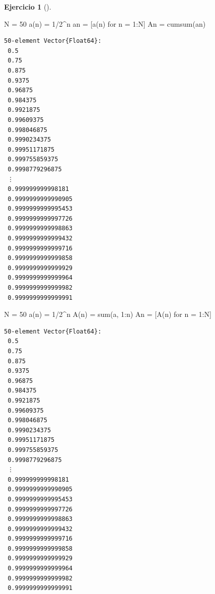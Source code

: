 \documentclass[
  a4paper,
]{scrreport}
\newenvironment{Shaded}{\begin{snugshade}}{\end{snugshade}}
\newcommand{\FloatTok}[1]{\textcolor[rgb]{0.68,0.00,0.00}{#1}}
\newcommand{\FunctionTok}[1]{\textcolor[rgb]{0.28,0.35,0.67}{#1}}
\newcommand{\NormalTok}[1]{\textcolor[rgb]{0.00,0.23,0.31}{#1}}
\newcommand{\OperatorTok}[1]{\textcolor[rgb]{0.37,0.37,0.37}{#1}}
\theoremstyle{definition}
\newtheorem{exercise}{Ejercicio}[chapter]
\theoremstyle{remark}
\begin{document}
\begin{exercise}[]
\begin{tcolorbox}
\begin{Shaded}
\begin{Highlighting}[]
\NormalTok{N }\OperatorTok{=} \FloatTok{50}
\FunctionTok{a}\NormalTok{(n) }\OperatorTok{=} \FloatTok{1}\OperatorTok{/}\FloatTok{2}\OperatorTok{\^{}}\NormalTok{n}
\NormalTok{an }\OperatorTok{=}\NormalTok{ [}\FunctionTok{a}\NormalTok{(n) for n }\OperatorTok{=} \FloatTok{1}\OperatorTok{:}\NormalTok{N]}
\NormalTok{An }\OperatorTok{=} \FunctionTok{cumsum}\NormalTok{(an)}
\end{Highlighting}
\end{Shaded}

\begin{verbatim}
50-element Vector{Float64}:
 0.5
 0.75
 0.875
 0.9375
 0.96875
 0.984375
 0.9921875
 0.99609375
 0.998046875
 0.9990234375
 0.99951171875
 0.999755859375
 0.9998779296875
 ⋮
 0.999999999998181
 0.9999999999990905
 0.9999999999995453
 0.9999999999997726
 0.9999999999998863
 0.9999999999999432
 0.9999999999999716
 0.9999999999999858
 0.9999999999999929
 0.9999999999999964
 0.9999999999999982
 0.9999999999999991
\end{verbatim}

\end{tcolorbox}

\begin{tcolorbox}[enhanced jigsaw, colframe=quarto-callout-tip-color-frame, breakable, colback=white, coltitle=black, left=2mm, toptitle=1mm, colbacktitle=quarto-callout-tip-color!10!white, bottomtitle=1mm, opacityback=0, opacitybacktitle=0.6, title=\textcolor{quarto-callout-tip-color}{\faLightbulb}\hspace{0.5em}{Solución 2}, titlerule=0mm, toprule=.15mm, arc=.35mm, leftrule=.75mm, rightrule=.15mm, bottomrule=.15mm]

\begin{Shaded}
\begin{Highlighting}[]
\NormalTok{N }\OperatorTok{=} \FloatTok{50}
\FunctionTok{a}\NormalTok{(n) }\OperatorTok{=} \FloatTok{1}\OperatorTok{/}\FloatTok{2}\OperatorTok{\^{}}\NormalTok{n}
\FunctionTok{A}\NormalTok{(n) }\OperatorTok{=} \FunctionTok{sum}\NormalTok{(a, }\FloatTok{1}\OperatorTok{:}\NormalTok{n)}
\NormalTok{An }\OperatorTok{=}\NormalTok{ [}\FunctionTok{A}\NormalTok{(n) for n }\OperatorTok{=} \FloatTok{1}\OperatorTok{:}\NormalTok{N]}
\end{Highlighting}
\end{Shaded}

\begin{verbatim}
50-element Vector{Float64}:
 0.5
 0.75
 0.875
 0.9375
 0.96875
 0.984375
 0.9921875
 0.99609375
 0.998046875
 0.9990234375
 0.99951171875
 0.999755859375
 0.9998779296875
 ⋮
 0.999999999998181
 0.9999999999990905
 0.9999999999995453
 0.9999999999997726
 0.9999999999998863
 0.9999999999999432
 0.9999999999999716
 0.9999999999999858
 0.9999999999999929
 0.9999999999999964
 0.9999999999999982
 0.9999999999999991
\end{verbatim}


\end{tcolorbox}
\end{exercise}
\end{document}
